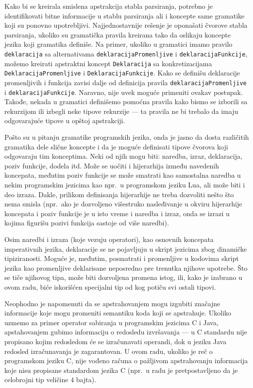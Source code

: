 Kako bi se kreirala smislena apstrakcija stabla parsiranja, potrebno je identifikovati bitne informacije u stablu parsiranja ali i koncepte same gramatike koji su ponovno upotrebljivi. Najjednostavnije rešenje je oponašati čvorove stabla parsiranja, ukoliko su gramatička pravila kreirana tako da oslikaju koncepte jezika koji gramatika definiše. Na primer, ukoliko u gramatici imamo pravilo \texttt{deklaracija} sa alternativama \texttt{deklaracijaPromenljive} i \texttt{deklaracijaFunkcije}, možemo kreirati apstraktni koncept \texttt{Deklaracija} sa konkretizacijama \texttt{DeklaracijaPromenljive} i \texttt{DeklaracijaFunkcije}. Kako se definišu deklaracije promenljivih i funkcija zavisi dalje od definicija pravila \texttt{deklaracijaPromenljive} i \texttt{deklaracijaFunkcije}. Naravno, nije uvek moguće primeniti ovakav postupak. Takođe, nekada u gramatici definišemo pomoćna pravila kako bismo se izborili sa rekurzijom ili izbegli neke tipove rekurzije --- ta pravila ne bi trebalo da imaju odgovarajuće tipove u opštoj apstrakciji. 

Pošto su u pitanju gramatike programskih jezika, onda je jasno da dosta različitih gramatika dele slične koncepte i da je moguće definisati tipove čvorova koji odgovaraju tim konceptima. Neki od njih mogu biti: naredba, izraz, deklaracija, poziv funkcije, dodela itd. Može se uočiti i hijerarhija između navedenih koncepata, međutim poziv funkcije se može smatrati kao samostalna naredba u nekim programskim jezicima kao npr.~u programskom jeziku Lua, ali može biti i deo izraza. Dakle, prilikom definisanja hijerarhije ne treba dozvoliti nešto što nema smisla (npr.~ako je dozvoljeno višestruko nasleđivanje u okviru hijerarhije koncepata i poziv funkcije je u isto vreme i naredba i izraz, onda se izrazi u kojima figurišu pozivi funkcija sastoje od više naredbi).

Osim naredbi i izraza (koje vezuju operatori), kao osnovnih koncepata imperativnih jezika, deklaracije se ne pojavljuju u skript jezicima zbog dinamičke tipiziranosti. Moguće je, međutim, posmatrati i promenljive u kodovima skript jezika kao promenljive deklarisane neposredno pre trenutka njihove upotrebe. Što se tiče njihovog tipa, može biti dozvoljena promena istog, ili, kako je izabrano u ovom radu, biće iskorišćen specijalni tip od kog potiču svi ostali tipovi.

Neophodno je napomenuti da se apstrahovanjem mogu izgubiti značajne informacije koje mogu promeniti semantiku koda koji se apstrahuje. Ukoliko uzmemo za primer operator sabiranja u programskim jezicima C i Java, apstahovanjem gubimo informaciju o redosledu izvršavanja --- u C standardu nije propisano kojim redosledom će se izračunavati operandi, dok u jeziku Java redosled izračunavanja je zagarantovan. U ovom radu, ukoliko je reč o programskom jeziku C, nije vođeno računa o pažljivom apstrahovanju informacija koje nisu propisane standardom jezika C (npr.~u radu je pretpostavljeno da je celobrojni tip veličine $4$ bajta).

